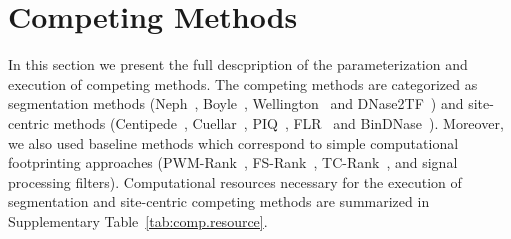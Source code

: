 \section{Competing Methods}
\label{sec:competing.methods}

In this section we present the full descpription of the parameterization and execution of competing methods. The competing methods are categorized as segmentation methods (Neph~\cite{neph2012a}, Boyle~\cite{boyle2011}, Wellington~\cite{piper2013} and DNase2TF~\cite{sung2014}) and site-centric methods (Centipede~\cite{pique2011}, Cuellar~\cite{cuellar2012}, PIQ~\cite{sherwood2014}, FLR~\cite{yardimci2014} and BinDNase~\cite{kahara2015}). Moreover, we also used baseline methods which correspond to simple computational footprinting approaches (PWM-Rank~\cite{gusmao2014}, FS-Rank~\cite{neph2012a,he2014}, TC-Rank~\cite{cuelar2012,he2014}, and signal processing filters). Computational resources necessary for the execution of segmentation and site-centric competing methods are summarized in Supplementary Table~\ref{tab:comp.resource}.

